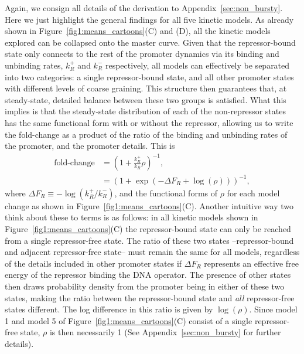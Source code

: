 Again, we consign all details of the derivation to
Appendix~\ref{sec:non_bursty}. Here we just highlight the general findings for
all five kinetic models. As already shown in Figure~\ref{fig1:means_cartoons}(C)
and (D), all the kinetic models explored can be collapsed onto the master curve.
Given that the repressor-bound state only connects to the rest of the promoter
dynamics via its binding and unbinding rates, $k_R^+$ and $k_R^-$ respectively,
all models can effectively be separated into two categories: a single
repressor-bound state, and all other promoter states with different levels of
coarse graining. This structure then guarantees that, at steady-state, detailed
balance between these two groups is satisfied. What this implies is that the
steady-state distribution of each of the non-repressor states has the same
functional form with or without the repressor, allowing us to write the
fold-change as a product of the ratio of the binding and unbinding rates of the
promoter, and the promoter details. This is 
\begin{align}
\text{fold-change} &= \left( 1 + \frac{k_R^+}{k_R^-} \rho \right)^{-1},\\
&= (1 + \exp(-\Delta F_R + \log(\rho) ))^{-1},
\end{align}
where $\Delta F_R \equiv -\log(k_R^+/k_R^-)$, and the functional forms of $\rho$
for each model change as shown in Figure~\ref{fig1:means_cartoons}(C). Another
intuitive way two think about these to terms is as follows: in all kinetic
models shown in Figure~\ref{fig1:means_cartoons}(C) the repressor-bound state
can only be reached from a single repressor-free state. The ratio of these two
states --repressor-bound and adjacent repressor-free state-- must remain the
same for all models, regardless of the details included in other promoter states
if $\Delta F_R$ represents an effective free energy of the repressor binding the
DNA operator. The presence of other states then draws probability density from
the promoter being in either of these two states, making the ratio between the
repressor-bound state and \textit{all} repressor-free states different. The log
difference in this ratio is given by $\log(\rho)$. Since model 1 and model 5 of
Figure~\ref{fig1:means_cartoons}(C) consist of a single repressor-free state,
$\rho$ is then necessarily 1 (See Appendix~\ref{sec:non_bursty} for further
details).

